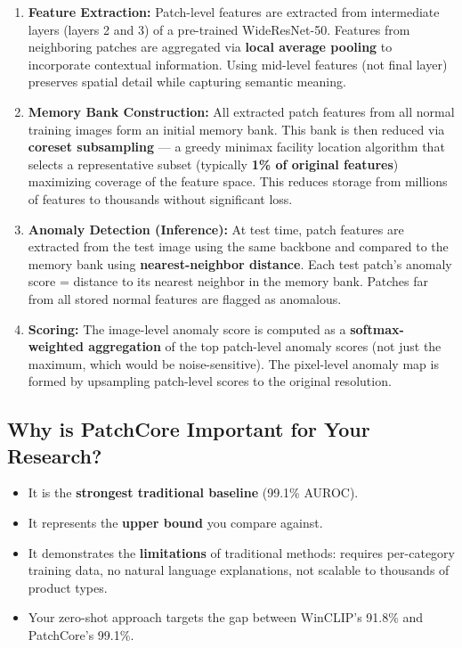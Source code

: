 \documentclass[12pt, a4paper]{article}
\begin{document}
\begin{enumerate}[leftmargin=*]
    \item \textbf{Feature Extraction:} Patch-level features are extracted from intermediate layers (layers 2 and 3) of a pre-trained WideResNet-50. Features from neighboring patches are aggregated via \textbf{local average pooling} to incorporate contextual information. Using mid-level features (not final layer) preserves spatial detail while capturing semantic meaning.

    \item \textbf{Memory Bank Construction:} All extracted patch features from all normal training images form an initial memory bank. This bank is then reduced via \textbf{coreset subsampling} --- a greedy minimax facility location algorithm that selects a representative subset (typically \textbf{1\% of original features}) maximizing coverage of the feature space. This reduces storage from millions of features to thousands without significant loss.

    \item \textbf{Anomaly Detection (Inference):} At test time, patch features are extracted from the test image using the same backbone and compared to the memory bank using \textbf{nearest-neighbor distance}. Each test patch's anomaly score = distance to its nearest neighbor in the memory bank. Patches far from all stored normal features are flagged as anomalous.

    \item \textbf{Scoring:} The image-level anomaly score is computed as a \textbf{softmax-weighted aggregation} of the top patch-level anomaly scores (not just the maximum, which would be noise-sensitive). The pixel-level anomaly map is formed by upsampling patch-level scores to the original resolution.
\end{enumerate}

\subsection{Why is PatchCore Important for Your Research?}
\begin{itemize}[leftmargin=*]
    \item It is the \textbf{strongest traditional baseline} (99.1\% AUROC).
    \item It represents the \textbf{upper bound} you compare against.
    \item It demonstrates the \textbf{limitations} of traditional methods: requires per-category training data, no natural language explanations, not scalable to thousands of product types.
    \item Your zero-shot approach targets the gap between WinCLIP's 91.8\% and PatchCore's 99.1\%.
\end{itemize}
\end{document}
